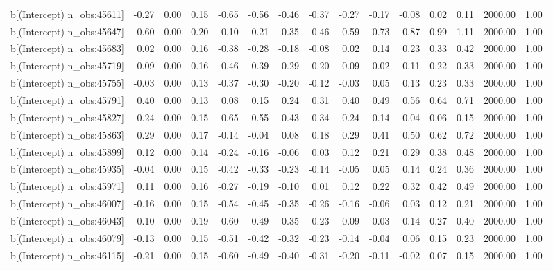 \begin{table}[ht]
\begin{tabular}{rrrrrrrrrrrrrrr}
  b[(Intercept) n\_obs:45611] & -0.27 & 0.00 & 0.15 & -0.65 & -0.56 & -0.46 & -0.37 & -0.27 & -0.17 & -0.08 & 0.02 & 0.11 & 2000.00 & 1.00 \\ 
  b[(Intercept) n\_obs:45647] & 0.60 & 0.00 & 0.20 & 0.10 & 0.21 & 0.35 & 0.46 & 0.59 & 0.73 & 0.87 & 0.99 & 1.11 & 2000.00 & 1.00 \\ 
  b[(Intercept) n\_obs:45683] & 0.02 & 0.00 & 0.16 & -0.38 & -0.28 & -0.18 & -0.08 & 0.02 & 0.14 & 0.23 & 0.33 & 0.42 & 2000.00 & 1.00 \\ 
  b[(Intercept) n\_obs:45719] & -0.09 & 0.00 & 0.16 & -0.46 & -0.39 & -0.29 & -0.20 & -0.09 & 0.02 & 0.11 & 0.22 & 0.33 & 2000.00 & 1.00 \\ 
  b[(Intercept) n\_obs:45755] & -0.03 & 0.00 & 0.13 & -0.37 & -0.30 & -0.20 & -0.12 & -0.03 & 0.05 & 0.13 & 0.23 & 0.33 & 2000.00 & 1.00 \\ 
  b[(Intercept) n\_obs:45791] & 0.40 & 0.00 & 0.13 & 0.08 & 0.15 & 0.24 & 0.31 & 0.40 & 0.49 & 0.56 & 0.64 & 0.71 & 2000.00 & 1.00 \\ 
  b[(Intercept) n\_obs:45827] & -0.24 & 0.00 & 0.15 & -0.65 & -0.55 & -0.43 & -0.34 & -0.24 & -0.14 & -0.04 & 0.06 & 0.15 & 2000.00 & 1.00 \\ 
  b[(Intercept) n\_obs:45863] & 0.29 & 0.00 & 0.17 & -0.14 & -0.04 & 0.08 & 0.18 & 0.29 & 0.41 & 0.50 & 0.62 & 0.72 & 2000.00 & 1.00 \\ 
  b[(Intercept) n\_obs:45899] & 0.12 & 0.00 & 0.14 & -0.24 & -0.16 & -0.06 & 0.03 & 0.12 & 0.21 & 0.29 & 0.38 & 0.48 & 2000.00 & 1.00 \\ 
  b[(Intercept) n\_obs:45935] & -0.04 & 0.00 & 0.15 & -0.42 & -0.33 & -0.23 & -0.14 & -0.05 & 0.05 & 0.14 & 0.24 & 0.36 & 2000.00 & 1.00 \\ 
  b[(Intercept) n\_obs:45971] & 0.11 & 0.00 & 0.16 & -0.27 & -0.19 & -0.10 & 0.01 & 0.12 & 0.22 & 0.32 & 0.42 & 0.49 & 2000.00 & 1.00 \\ 
  b[(Intercept) n\_obs:46007] & -0.16 & 0.00 & 0.15 & -0.54 & -0.45 & -0.35 & -0.26 & -0.16 & -0.06 & 0.03 & 0.12 & 0.21 & 2000.00 & 1.00 \\ 
  b[(Intercept) n\_obs:46043] & -0.10 & 0.00 & 0.19 & -0.60 & -0.49 & -0.35 & -0.23 & -0.09 & 0.03 & 0.14 & 0.27 & 0.40 & 2000.00 & 1.00 \\ 
  b[(Intercept) n\_obs:46079] & -0.13 & 0.00 & 0.15 & -0.51 & -0.42 & -0.32 & -0.23 & -0.14 & -0.04 & 0.06 & 0.15 & 0.23 & 2000.00 & 1.00 \\ 
  b[(Intercept) n\_obs:46115] & -0.21 & 0.00 & 0.15 & -0.60 & -0.49 & -0.40 & -0.31 & -0.20 & -0.11 & -0.02 & 0.07 & 0.15 & 2000.00 & 1.00 \\ 

\end{tabular}
\end{table}
